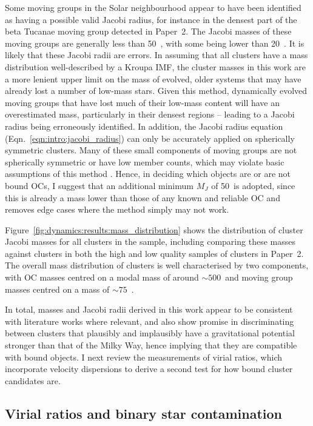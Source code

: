 Some moving groups in the Solar neighbourhood appear to have been identified as having a possible valid Jacobi radius, for instance in the densest part of the beta Tucanae moving group detected in Paper~2. The Jacobi masses of these moving groups are generally less than 50~\MSun, with some being lower than 20~\MSun. It is likely that these Jacobi radii are errors. In assuming that all clusters have a mass distribution well-described by a Kroupa IMF, the cluster masses in this work are a more lenient upper limit on the mass of evolved, older systems that may have already lost a number of low-mass stars. Given this method, dynamically evolved moving groups that have lost much of their low-mass content will have an overestimated mass, particularly in their densest regions -- leading to a Jacobi radius being erroneously identified. In addition, the Jacobi radius equation (Eqn.~\ref{eqn:intro:jacobi_radius}) can only be accurately applied on spherically symmetric clusters. Many of these small components of moving groups are not spherically symmetric or have low member counts, which may violate basic assumptions of this method \citep{binney_galactic_1987}. Hence, in deciding which objects are or are not bound OCs, I suggest that an additional minimum $M_J$ of 50~\MSun is adopted, since this is already a mass lower than those of any known and reliable OC and removes edge cases where the method simply may not work.

Figure~\ref{fig:dynamics:results:mass_distribution} shows the distribution of cluster Jacobi masses for all clusters in the sample, including comparing these masses against clusters in both the high and low quality samples of clusters in Paper~2. The overall mass distribution of clusters is well characterised by two components, with OC masses centred on a modal mass of around $\sim500$~\MSun and moving group masses centred on a mass of $\sim75$~\MSun. 

In total, masses and Jacobi radii derived in this work appear to be consistent with literature works where relevant, and also show promise in discriminating between clusters that plausibly and implausibly have a gravitational potential stronger than that of the Milky Way, hence implying that they are compatible with bound objects. I next review the measurements of virial ratios, which incorporate velocity dispersions to derive a second test for how bound cluster candidates are. 


\subsection{Virial ratios and binary star contamination}
\label{sec:dynamics:results:virial}

